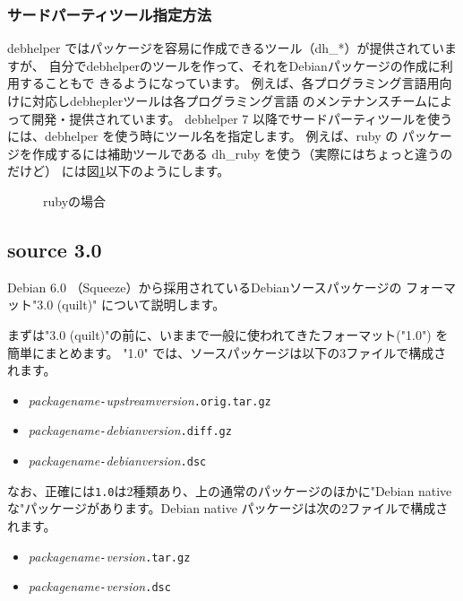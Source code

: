 \documentclass[mingoth,a4paper]{jsarticle}
\begin{document}
\subsubsection{サードパーティツール指定方法}

debhelper ではパッケージを容易に作成できるツール（dh\_*）が提供されていますが、
自分でdebhelperのツールを作って、それをDebianパッケージの作成に利用することもで
きるようになっています。
例えば、各プログラミング言語用向けに対応しdebheplerツールは各プログラミング言語
のメンテナンスチームによって開発・提供されています。
debhelper 7 以降でサードパーティツールを使うには、debhelper を使う時にツール名を指定します。
例えば、ruby の パッケージを作成するには補助ツールである dh\_ruby を使う（実際にはちょっと違うのだけど）
には図\ref{fig:ruby_setting}以下のようにします。

\begin{figure}[h]

\caption{rubyの場合}
\label{fig:ruby_setting}
\end{figure}


\subsection{source 3.0}

Debian 6.0 （Squeeze）から採用されているDebianソースパッケージの
フォーマット"3.0 (quilt)" について説明します。

まずは"3.0 (quilt)"の前に、いままで一般に使われてきたフォーマット("1.0")
を簡単にまとめます。
"1.0" では、ソースパッケージは以下の3ファイルで構成されます。
\begin{itemize}
 \item \textit{packagename}\verb|-|\textit{upstreamversion}\verb|.orig.tar.gz|
 \item \textit{packagename}\verb|-|\textit{debianversion}\verb|.diff.gz|
 \item \textit{packagename}\verb|-|\textit{debianversion}\verb|.dsc|
\end{itemize}

なお、正確には\verb|1.0|は2種類あり、上の通常のパッケージのほかに"Debian   
nativeな"パッケージがあります。Debian native パッケージは次の2ファイルで構成されます。
\begin{itemize}
 \item \textit{packagename}\verb|-|\textit{version}\verb|.tar.gz|
 \item \textit{packagename}\verb|-|\textit{version}\verb|.dsc|
\end{itemize}
\end{document}
